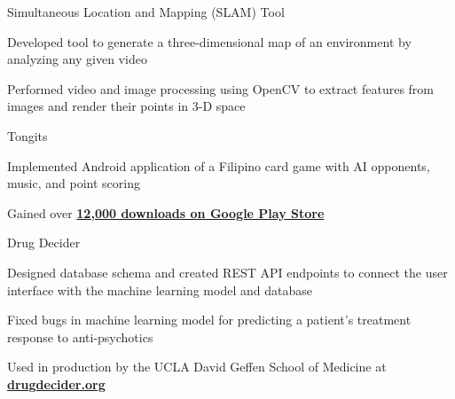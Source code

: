 \documentclass[12pt, letterpaper]{awesome-cv}
\begin{document}
\begin{cventries}
  \cventry
    {} %
    {Simultaneous Location and Mapping (SLAM) Tool} %
    {} %
    {} %
    {
      \vspace{-0.2in}
      \begin{cvitems} %
        \item {Developed tool to generate a three-dimensional map of an environment by analyzing any given video}
		    \item {Performed video and image processing using OpenCV to extract features from images and render their points in 3-D space}
      \end{cvitems}
    }

  \cventry
    {} %
    {Tongits} %
    {} %
    {} %
    {
      \vspace{-0.2in}
      \begin{cvitems} %
      	\item {Implemented Android application of a Filipino card game with AI opponents, music, and point scoring}
		    \item 
            Gained over \href{https://play.google.com/store/apps/details?id=com.creativelabs.tongits&hl=en_US/}{\textbf{12,000 downloads on Google Play Store}}
      \end{cvitems}
    }

  \cventry
    {} %
    {Drug Decider} %
    {} %
    {} %
    {
      \vspace{-0.2in}
      \begin{cvitems} %
      	\item {Designed database schema and created REST API endpoints to connect the user interface with the machine learning model and database}
		    \item {Fixed bugs in machine learning model for predicting a patient’s treatment response to anti-psychotics}
        \item
            Used in production by the UCLA David Gef\/fen School of Medicine at \href{https://drugdecider.org}{\textbf{drugdecider.org}}
      \end{cvitems}
    }

\end{cventries}
\end{document}
